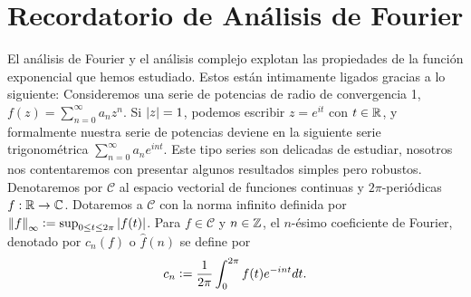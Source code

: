 \section{Recordatorio de Análisis de Fourier}
El análisis de Fourier y el análisis complejo explotan las propiedades de la función 
exponencial que hemos estudiado. Estos están intimamente ligados gracias a lo siguiente:
Consideremos una serie de potencias de radio de convergencia 1, \(f(z) = \sum_{n=0}^{\infty} a_nz^n\).
Si \(\left\lvert z\right\rvert = 1\), podemos escribir \(z = e^{it}\) con \(t\in \mathbb{R}\), y formalmente nuestra serie de 
potencias deviene en la siguiente serie trigonométrica \(\sum_{n=0}^{\infty}a_ne^{int}\). Este tipo 
series son delicadas de estudiar, nosotros nos contentaremos con presentar algunos resultados simples
pero robustos. Denotaremos por \(\mathcal{C}\) al espacio vectorial de funciones continuas y 
\(2\pi\)-periódicas \(f: \mathbb{R} \to \mathbb{C} \). Dotaremos a \(\mathcal{C}\) con la norma infinito definida por
\(\left\lVert f\right\rVert_{\infty} \vcentcolon = \sup_{0\leq t \leq 2\pi} \left\lvert f(t)\right\rvert \). Para \(f \in \mathcal{C}\) y 
\(n\in \mathbb{Z}\), el \(n\)-ésimo coeficiente de Fourier, denotado por \(c_n(f)\) o \(\hat{f}(n)\) se define
por 
\[
c_n \vcentcolon = \frac{1}{2\pi} \int_{0}^{2\pi} f(t) e^{-int} dt.
\]
